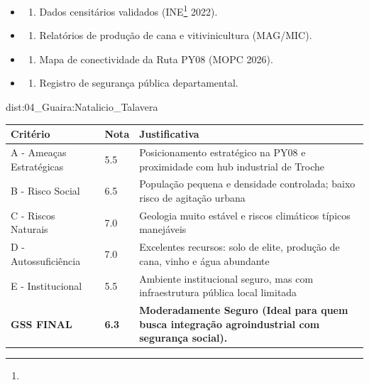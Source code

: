 {\begin{itemize}
\tightlist
\item
  \begin{enumerate}
  \def\labelenumi{\arabic{enumi})}
  \tightlist
  \item
    Dados censitários validados (INE\footnote{\fineINE} 2022).
  \end{enumerate}
\item
  \begin{enumerate}
  \def\labelenumi{\arabic{enumi})}
  \setcounter{enumi}{1}
  \tightlist
  \item
    Relatórios de produção de cana e vitivinicultura (MAG/\allowbreak MIC).
  \end{enumerate}
\item
  \begin{enumerate}
  \def\labelenumi{\arabic{enumi})}
  \setcounter{enumi}{2}
  \tightlist
  \item
    Mapa de conectividade da Ruta PY08 (MOPC 2026).
  \end{enumerate}
\item
  \begin{enumerate}
  \def\labelenumi{\arabic{enumi})}
  \setcounter{enumi}{3}
  \tightlist
  \item
    Registro de segurança pública departamental.
  \end{enumerate}
\end{itemize}}{dist:04_Guaira:Natalicio_Talavera}
\begin{table}[ht!]
\small \begin{tabular}{p{3.0cm}p{0.8cm}p{6.0cm}} \toprule
\textbf{Critério} & \textbf{Nota} & \textbf{Justificativa} \\ \midrule
A - Ameaças Estratégicas & 5.5 & Posicionamento estratégico na PY08 e proximidade com hub industrial de Troche \\
B - Risco Social & 6.5 & População pequena e densidade controlada; baixo risco de agitação urbana \\
C - Riscos Naturais & 7.0 & Geologia muito estável e riscos climáticos típicos manejáveis \\
D - Autossuficiência & 7.0 & Excelentes recursos: solo de elite, produção de cana, vinho e água abundante \\
E - Institucional & 5.5 & Ambiente institucional seguro, mas com infraestrutura pública local limitada \\
\midrule \textbf{GSS FINAL} & \textbf{6.3} & \textbf{Moderadamente Seguro (Ideal para quem busca integração agroindustrial com segurança social).} \\ \bottomrule \end{tabular}
\end{table}
